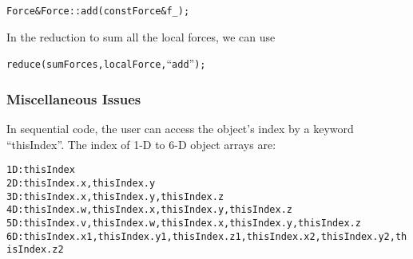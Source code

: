 \begin{alltt}
    Force& Force::add(const Force& f_);
\end{alltt}

In the reduction to sum all the local forces, we can use

\begin{alltt}
    reduce(sumForces, localForce, ``add'');
\end{alltt}

\subsubsection{Miscellaneous Issues}
In sequential code, the user can access the object's index by a keyword 
``thisIndex''. The index of 1-D to 6-D object arrays are:

\begin{alltt}
1D: thisIndex
2D: thisIndex.x, thisIndex.y
3D: thisIndex.x, thisIndex.y, thisIndex.z
4D: thisIndex.w, thisIndex.x, thisIndex.y, thisIndex.z
5D: thisIndex.v, thisIndex.w, thisIndex.x, thisIndex.y, thisIndex.z
6D: thisIndex.x1, thisIndex.y1, thisIndex.z1, thisIndex.x2, thisIndex.y2, thisIndex.z2
\end{alltt}


